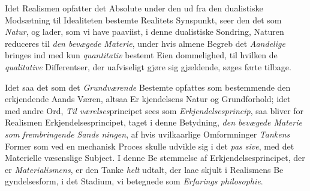 Idet Realismen opfatter det Absolute under den ud fra
den dualistiske Modsætning til Idealiteten bestemte Realitets
Synspunkt, seer den det som \emph{Natur}, og lader, som vi have
paaviist, i denne dualistiske Sondring, Naturen reduceres til
\emph{den bevægede Materie}, under hvis almene Begreb det
\emph{Aandelige} bringes ind med kun \emph{quantitativ} bestemt Eien\-%
dommelighed, til hvilken de \emph{qualitative} Differentser, der
uafviseligt gjøre sig gjældende, søges førte tilbage.

Idet saa det som det \emph{Grundværende} Bestemte opfattes
som bestemmende den erkjendende Aands Væren, altsaa Er\-%
kjendelsens Natur og Grundforhold; idet med andre Ord, \emph{Til\-%
værelses}principet sees som \emph{Erkjendelsesprincip}, saa bliver
for Realismen Erkjendelsesprincipet, taget i denne Betydning,
\emph{den bevægede Materie som frembringende Sands\-%
ningen}, af hvis uvilkaarlige Omformninger \emph{Tankens} Former
som ved en mechanisk Proces skulle udvikle sig i det \emph{pas\-%
sive}, med det Materielle væsenslige Subject. I denne Be\-%
stemmelse af Erkjendelsesprincipet, der er \emph{Materialismens},
er den Tanke \emph{helt} udtalt, der laae skjult i Realismens Be\-%
gyndelsesform, i det Stadium, vi betegnede som \emph{Erfarings\-%
philosophie}.

